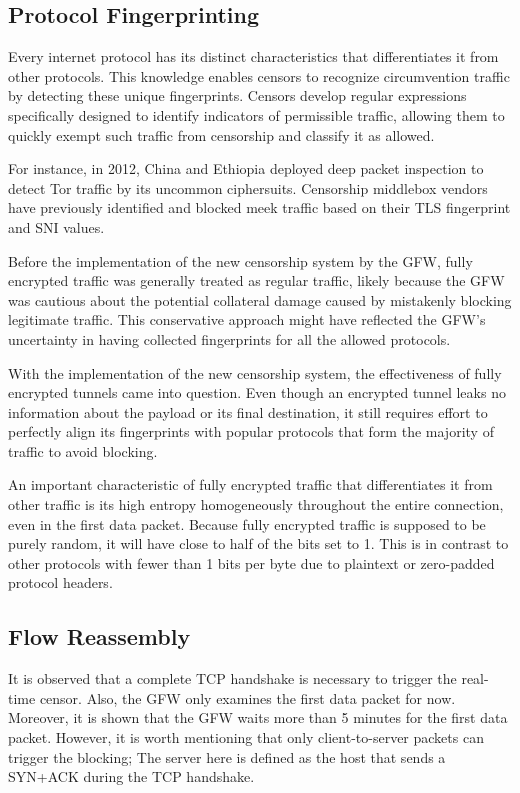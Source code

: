 \subsection{Protocol Fingerprinting}
Every internet protocol has its distinct characteristics that differentiates it from other protocols. This knowledge enables censors to recognize circumvention traffic by detecting these unique fingerprints. Censors develop regular expressions specifically designed to identify indicators of permissible traffic, allowing them to quickly exempt such traffic from censorship and classify it as allowed.

For instance, in 2012, China and Ethiopia deployed deep packet inspection to detect Tor traffic by its uncommon ciphersuits. Censorship middlebox vendors have previously identified and blocked meek traffic based on their TLS fingerprint and SNI values.\cite{wu2023great}

Before the implementation of the new censorship system by the GFW, fully encrypted traffic was generally treated as regular traffic, likely because the GFW was cautious about the potential collateral damage caused by mistakenly blocking legitimate traffic. This conservative approach might have reflected the GFW's uncertainty in having collected fingerprints for all the allowed protocols.

With the implementation of the new censorship system, the effectiveness of fully encrypted tunnels came into question. Even though an encrypted tunnel leaks no information about the payload or its final destination, it still requires effort to perfectly align its fingerprints with popular protocols that form the majority of traffic to avoid blocking.

An important characteristic of fully encrypted traffic that differentiates it from other traffic is its high entropy homogeneously throughout the entire connection, even in the first data packet. Because fully encrypted traffic is supposed to be purely random, it will have close to half of the bits set to 1. This is in contrast to other protocols with fewer than 1 bits per byte due to plaintext or zero-padded protocol headers.\cite{wu2023great}

\subsection{Flow Reassembly}
It is observed that a complete TCP handshake is necessary to trigger the real-time censor. Also, the GFW only examines the first data packet for now. Moreover, it is shown that the GFW waits more than 5 minutes for the first data packet. However, it is worth mentioning that only client-to-server packets can trigger the blocking; The server here is defined as the host that sends a SYN+ACK during the TCP handshake.\cite{wu2023great}

